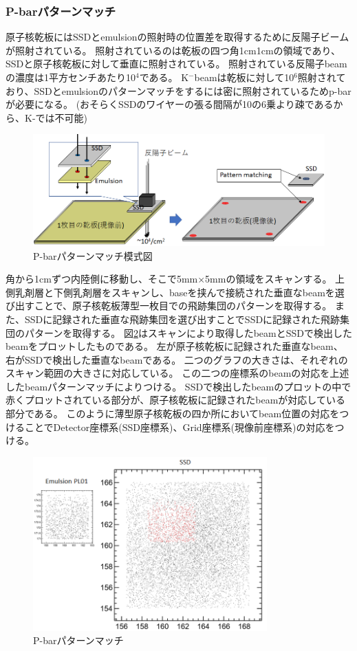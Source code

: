 \documentclass[12pt,a4paper]{jarticle}
\begin{document}
\subsubsection{P-barパターンマッチ}
原子核乾板にはSSDとemulsionの照射時の位置差を取得するために反陽子ビームが照射されている。
照射されているのは乾板の四つ角1cm1cmの領域であり、SSDと原子核乾板に対して垂直に照射されている。
照射されている反陽子beamの濃度は1平方センチあたり10$^4$である。
K$^-$beamは乾板に対して10$^6$照射されており、SSDとemulsionのパターンマッチをするには密に照射されているためp-barが必要になる。
(おそらくSSDのワイヤーの張る間隔が10の6乗より疎であるから、K-では不可能)
\begin{figure}[htbp]
  \centering
     \includegraphics[width=140mm]{pbar_mosikizu.png}
  \caption{P-barパターンマッチ模式図\label{fig:pbar_mosikizu}}
\end{figure}
\par
角から1cmずつ内陸側に移動し、そこで5mm×5mmの領域をスキャンする。
上側乳剤層と下側乳剤層をスキャンし、baseを挟んで接続された垂直なbeamを選び出すことで、原子核乾板薄型一枚目での飛跡集団のパターンを取得する。
また、SSDに記録された垂直な飛跡集団を選び出すことでSSDに記録された飛跡集団のパターンを取得する。
図\ref{fig:pbar_pattern}はスキャンにより取得したbeamとSSDで検出したbeamをプロットしたものである。
左が原子核乾板に記録された垂直なbeam、右がSSDで検出した垂直なbeamである。
二つのグラフの大きさは、それぞれのスキャン範囲の大きさに対応している。
この二つの座標系のbeamの対応を上述したbeamパターンマッチによりつける。
SSDで検出したbeamのプロットの中で赤くプロットされている部分が、原子核乾板に記録されたbeamが対応している部分である。
このように薄型原子核乾板の四か所においてbeam位置の対応をつけることでDetector座標系(SSD座標系)、Grid座標系(現像前座標系)の対応をつける。
\begin{figure}[htbp]
  \centering
     \includegraphics[width=90mm]{pbar_pattern.png}
  \caption{P-barパターンマッチ\label{fig:pbar_pattern}}
\end{figure}
\end{document}
